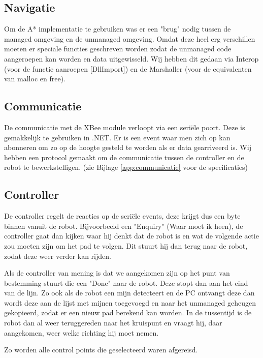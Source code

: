 \documentclass{report}
\begin{document}
\subsection{Navigatie}
Om de A* implementatie te gebruiken was er een "brug" nodig tussen de managed omgeving en de unmanaged omgeving.
Omdat deze heel erg verschillen moeten er speciale functies geschreven worden zodat de unmanaged code aangeroepen kan worden en data uitgewisseld.
Wij hebben dit gedaan via Interop (voor de functie aanroepen [DllImport]) en de Marshaller (voor de equivalenten van malloc en free).
\subsection{Communicatie}
De communicatie met de XBee module verloopt via een seriële poort. Deze is gemakkelijk te gebruiken in .NET. Er is een event waar men zich op kan abonneren om zo op de hoogte gesteld te worden als er data gearriveerd is. Wij hebben een protocol gemaakt om de communicatie tussen de controller en de robot te bewerkstelligen. (zie Bijlage \ref{app:communicatie} voor de specificaties)

\subsection{Controller}
De controller regelt de reacties op de seriële events, deze krijgt dus een byte binnen vanuit de robot. Bijvoorbeeld een "Enquiry" (Waar moet ik heen), de controller gaat dan kijken waar hij denkt dat de robot is en wat de volgende actie zou moeten zijn om het pad te volgen.
Dit stuurt hij dan terug naar de robot, zodat deze weer verder kan rijden.

Als de controller van mening is dat we aangekomen zijn op het punt van bestemming stuurt die een "Done" naar de robot. Deze stopt dan aan het eind van de lijn.
Zo ook als de robot een mijn detecteert en de PC ontvangt deze dan wordt deze aan de lijst met mijnen toegevoegd en naar het unmanaged geheugen gekopieerd, zodat er een nieuw pad berekend kan worden.
In de tussentijd is de robot dan al weer teruggereden naar het kruispunt en vraagt hij, daar aangekomen, weer welke richting hij moet nemen.

Zo worden alle control points die geselecteerd waren afgereisd.
\end{document}
